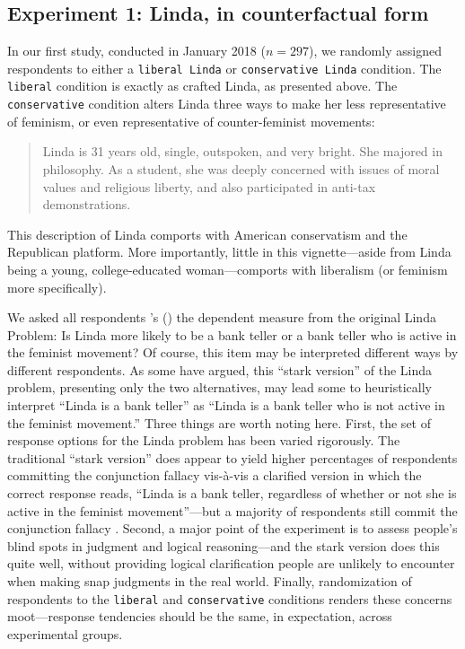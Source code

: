\documentclass[12pt, letterpaper]{article}
\def\citeapos#1{\citeauthor{#1}'s (\citeyear{#1})}
\begin{document}
\subsection{Experiment 1: Linda, in counterfactual form}

In our first study, conducted in January 2018 ($n=297$), we randomly assigned respondents to either a {\tt liberal Linda} or {\tt conservative Linda} condition. The {\tt liberal} condition is exactly as \citet{tversky1983extension} crafted Linda, as presented above. The {\tt conservative} condition alters Linda three ways to make her less representative of feminism, or even representative of counter-feminist movements:
\begin{quotation}
\noindent Linda is 31 years old, single, outspoken, and very bright. She majored in philosophy. As a student, she was deeply concerned with issues of moral values and religious liberty, and also participated in anti-tax demonstrations.
\end{quotation}
\noindent This description of Linda comports with American conservatism and the Republican platform. More importantly, little in this vignette---aside from Linda being a young, college-educated woman---comports with liberalism (or feminism more specifically). 

We asked all respondents \citeapos{tversky1983extension} the dependent measure from the original Linda Problem: Is Linda more likely to be a bank teller or a bank teller who is active in the feminist movement? Of course, this item may be interpreted different ways by different respondents. As some have argued, this ``stark version'' of the Linda problem, presenting only the two alternatives, may lead some to heuristically interpret ``Linda is a bank teller'' as ``Linda is a bank teller who is not active in the feminist movement.'' Three things are worth noting here. First, the set of response options for the Linda problem has been varied rigorously. The traditional ``stark version'' does appear to yield higher percentages of respondents committing the conjunction fallacy vis-\`{a}-vis a clarified version in which the correct response reads, ``Linda is a bank teller, regardless of whether or not she is active in the feminist movement''---but a majority of respondents still commit the conjunction fallacy \citep{messer1993another}. Second, a major point of the experiment is to assess people's blind spots in judgment and logical reasoning---and the stark version does this quite well, without providing logical clarification people are unlikely to encounter when making snap judgments in the real world. Finally, randomization of respondents to the {\tt liberal} and {\tt conservative} conditions renders these concerns moot---response tendencies should be the same, in expectation, across experimental groups. 
\end{document}
